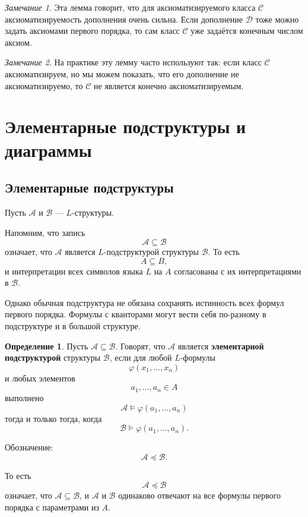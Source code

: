 \documentclass[12pt,a4paper,oneside,openany]{book}
\theoremstyle{definition}
\newtheorem{definition}{Определение}[chapter]
\theoremstyle{plain}
\theoremstyle{remark}
\newtheorem{remark}{Замечание}[chapter]
\begin{document}
\begin{remark}
Эта лемма говорит, что для аксиоматизируемого класса $\mathcal C$ аксиоматизируемость дополнения очень сильна. Если дополнение $\mathcal D$ тоже можно задать аксиомами первого порядка, то сам класс $\mathcal C$ уже задаётся конечным числом аксиом.
\end{remark}

\begin{remark}
На практике эту лемму часто используют так: если класс $\mathcal C$ аксиоматизируем, но мы можем показать, что его дополнение не аксиоматизируемо, то $\mathcal C$ не является конечно аксиоматизируемым.
\end{remark}








\section{Элементарные подструктуры и диаграммы}

\subsection{Элементарные подструктуры}

Пусть $\mathcal A$ и $\mathcal B$ — $L$-структуры.

Напомним, что запись
\[
\mathcal A\subseteq \mathcal B
\]
означает, что $\mathcal A$ является $L$-подструктурой структуры $\mathcal B$. То есть
\[
A\subseteq B,
\]
и интерпретации всех символов языка $L$ на $A$ согласованы с их интерпретациями в $\mathcal B$.

Однако обычная подструктура не обязана сохранять истинность всех формул первого порядка. Формулы с кванторами могут вести себя по-разному в подструктуре и в большой структуре.

\begin{definition}
Пусть $\mathcal A\subseteq\mathcal B$. Говорят, что $\mathcal A$ является \textbf{элементарной подструктурой} структуры $\mathcal B$, если для любой $L$-формулы
\[
\varphi(x_1,\ldots,x_n)
\]
и любых элементов
\[
a_1,\ldots,a_n\in A
\]
выполнено
\[
\mathcal A\models \varphi(a_1,\ldots,a_n)
\]
тогда и только тогда, когда
\[
\mathcal B\models \varphi(a_1,\ldots,a_n).
\]
\end{definition}

Обозначение:
\[
\mathcal A\preccurlyeq\mathcal B.
\]

То есть
\[
\mathcal A\preccurlyeq\mathcal B
\]
означает, что $\mathcal A\subseteq\mathcal B$, и $\mathcal A$ и $\mathcal B$ одинаково отвечают на все формулы первого порядка с параметрами из $A$.
\end{document}
